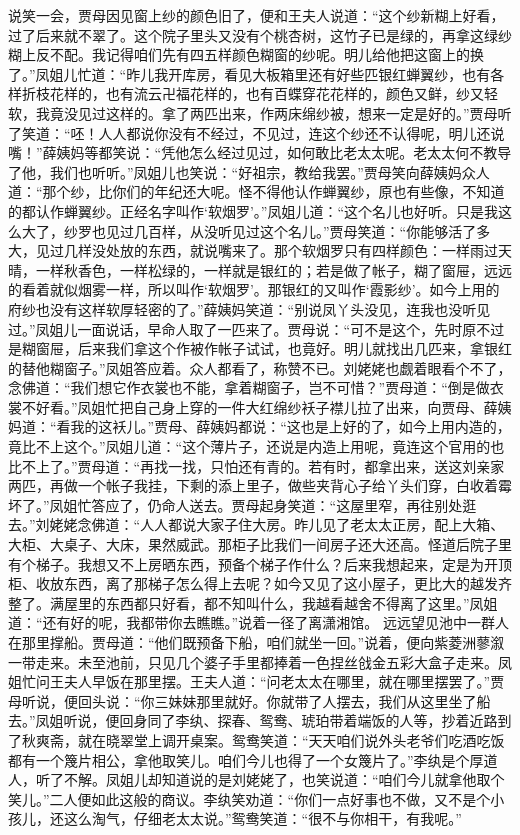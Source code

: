 \documentclass[12pt,oneside]{book}
\begin{document}
说笑一会，贾母因见窗上纱的颜色旧了，便和王夫人说道：“这个纱新糊上好看，过了后来就不翠了。这个院子里头又没有个桃杏树，这竹子已是绿的，再拿这绿纱糊上反不配。我记得咱们先有四五样颜色糊窗的纱呢。明儿给他把这窗上的换了。”凤姐儿忙道：“昨儿我开库房，看见大板箱里还有好些匹银红蝉翼纱，也有各样折枝花样的，也有流云卍福花样的，也有百蝶穿花花样的，颜色又鲜，纱又轻软，我竟没见过这样的。拿了两匹出来，作两床绵纱被，想来一定是好的。”贾母听了笑道：“呸！人人都说你没有不经过，不见过，连这个纱还不认得呢，明儿还说嘴！”薛姨妈等都笑说：“凭他怎么经过见过，如何敢比老太太呢。老太太何不教导了他，我们也听听。”凤姐儿也笑说：“好祖宗，教给我罢。”贾母笑向薛姨妈众人道：“那个纱，比你们的年纪还大呢。怪不得他认作蝉翼纱，原也有些像，不知道的都认作蝉翼纱。正经名字叫作‘软烟罗’。”凤姐儿道：“这个名儿也好听。只是我这么大了，纱罗也见过几百样，从没听见过这个名儿。”贾母笑道：“你能够活了多大，见过几样没处放的东西，就说嘴来了。那个软烟罗只有四样颜色：一样雨过天晴，一样秋香色，一样松绿的，一样就是银红的；若是做了帐子，糊了窗屉，远远的看着就似烟雾一样，所以叫作‘软烟罗’。那银红的又叫作‘霞影纱’。如今上用的府纱也没有这样软厚轻密的了。”薛姨妈笑道：“别说凤丫头没见，连我也没听见过。”凤姐儿一面说话，早命人取了一匹来了。贾母说：“可不是这个，先时原不过是糊窗屉，后来我们拿这个作被作帐子试试，也竟好。明儿就找出几匹来，拿银红的替他糊窗子。”凤姐答应着。众人都看了，称赞不已。刘姥姥也觑着眼看个不了，念佛道：“我们想它作衣裳也不能，拿着糊窗子，岂不可惜？”贾母道：“倒是做衣裳不好看。”凤姐忙把自己身上穿的一件大红绵纱袄子襟儿拉了出来，向贾母、薛姨妈道：“看我的这袄儿。”贾母、薛姨妈都说：“这也是上好的了，如今上用内造的，竟比不上这个。”凤姐儿道：“这个薄片子，还说是内造上用呢，竟连这个官用的也比不上了。”贾母道：“再找一找，只怕还有青的。若有时，都拿出来，送这刘亲家两匹，再做一个帐子我挂，下剩的添上里子，做些夹背心子给丫头们穿，白收着霉坏了。”凤姐忙答应了，仍命人送去。贾母起身笑道：“这屋里窄，再往别处逛去。”刘姥姥念佛道：“人人都说大家子住大房。昨儿见了老太太正房，配上大箱、大柜、大桌子、大床，果然威武。那柜子比我们一间房子还大还高。怪道后院子里有个梯子。我想又不上房晒东西，预备个梯子作什么？后来我想起来，定是为开顶柜、收放东西，离了那梯子怎么得上去呢？如今又见了这小屋子，更比大的越发齐整了。满屋里的东西都只好看，都不知叫什么，我越看越舍不得离了这里。”凤姐道：“还有好的呢，我都带你去瞧瞧。”说着一径了离潇湘馆。
远远望见池中一群人在那里撑船。贾母道：“他们既预备下船，咱们就坐一回。”说着，便向紫菱洲蓼溆一带走来。未至池前，只见几个婆子手里都捧着一色捏丝戗金五彩大盒子走来。凤姐忙问王夫人早饭在那里摆。王夫人道：“问老太太在哪里，就在哪里摆罢了。”贾母听说，便回头说：“你三妹妹那里就好。你就带了人摆去，我们从这里坐了船去。”凤姐听说，便回身同了李纨、探春、鸳鸯、琥珀带着端饭的人等，抄着近路到了秋爽斋，就在晓翠堂上调开桌案。鸳鸯笑道：“天天咱们说外头老爷们吃酒吃饭都有一个篾片相公，拿他取笑儿。咱们今儿也得了一个女篾片了。”李纨是个厚道人，听了不解。凤姐儿却知道说的是刘姥姥了，也笑说道：“咱们今儿就拿他取个笑儿。”二人便如此这般的商议。李纨笑劝道：“你们一点好事也不做，又不是个小孩儿，还这么淘气，仔细老太太说。”鸳鸯笑道：“很不与你相干，有我呢。”
\end{document}
